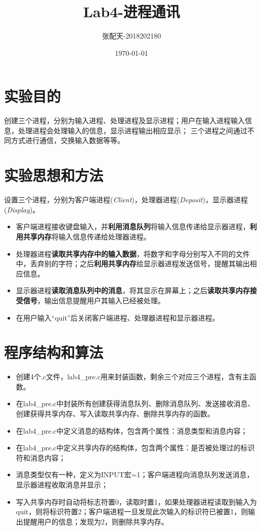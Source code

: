 \documentclass[UTF8]{ctexart}
\title{Lab4-进程通讯}
\author{张配天-2018202180}
\date{\today}
\begin{document}
    \maketitle
    \tableofcontents
    \section{实验目的}
    创建三个进程，分别为输入进程、处理进程及显示进程；用户在输入进程输入信息，处理进程会处理输入的信息，显示进程输出相应显示；
    三个进程之间通过不同方式进行通信，交换输入数据等等。
    \section{实验思想和方法}
    设置三个进程，分别为客户端进程(\emph{Client})，处理器进程(\emph{Deposit})，显示器进程(\emph{Display})。
    \begin{itemize}
        \item 客户端进程接收键盘输入，并\textbf{利用消息队列}将输入信息传递给显示器进程，\textbf{利用共享内存}将输入信息传递给处理器进程。
        \item 处理器进程\textbf{读取共享内存中的输入数据}，将数字和字母分别写入不同的文件中，丢弃别的字符；之后\textbf{利用共享内存}给显示器进程发送信号，提醒其输出相应信息。
        \item 显示器进程\textbf{读取消息队列中的消息}，将其显示在屏幕上；之后\textbf{读取共享内存接受信号}，输出信息提醒用户其输入已经被处理。
        \item 在用户输入“quit”后关闭客户端进程、处理器进程和显示器进程。
    \end{itemize}
    \section{程序结构和算法}

\begin{itemize}
    \item 创建4个.c文件，lab4\_pre.c用来封装函数，剩余三个对应三个进程，含有主函数。
    \item 在lab4\_pre.c中封装所有创建获得消息队列、删除消息队列、发送接收消息、创建获得共享内存、写入读取共享内存、删除共享内存的函数。
    \item 在lab4\_pre.c中定义消息的结构体，包含两个属性：消息类型和消息内容；
    \item 在lab4\_pre.c中定义共享内存的结构体，包含两个属性：是否被处理过的标识符和消息内容；
    \item 消息类型仅有一种，定义为INPUT宏=1；客户端进程向消息队列发送消息，显示器进程收取消息并显示；
    \item 写入共享内存时自动将标志符置0，读取时置1，如果处理器进程读取到输入为quit，则将标识符置2；客户端进程一旦发现此次输入的标识符已被置1，则输出提醒用户的信息；发现为2，则删除共享内存。
\end{itemize}
\end{document}
